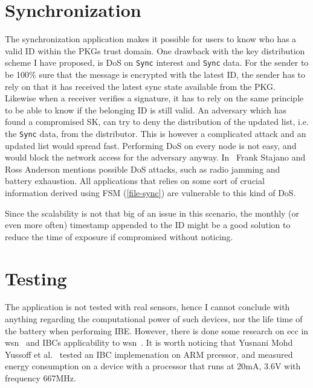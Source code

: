 \section{Synchronization}
The synchronization application makes it possible for users to know who has a valid \gls{ID} within the \gls{PKG}s trust domain.
One drawback with the key distribution scheme I have proposed, is \gls{DoS} on \texttt{Sync} \gls{interest} and \texttt{Sync} \gls{data}. 
For the sender to be 100\% sure that the message is encrypted with the latest \gls{ID}, the sender has to rely on that it has received the latest sync state available from the \gls{PKG}.
Likewise when a \gls{receiver} verifies a signature, it has to rely on the same principle to be able to know if the belonging \gls{ID} is still valid.
An adversary which has found a compromised \gls{SK}, can try to deny the distribution of the updated list, i.e. the \texttt{Sync} \gls{data}, from the distributor. 
This is however a complicated attack and an updated list would spread fast.
Performing \gls{DoS} on every node is not easy, and would block the network access for the adversary anyway.
In~\cite{DBLP:conf/spw/StajanoA99} Frank Stajano and Ross Anderson mentions possible \gls{DoS} attacks, such as radio jamming and battery exhaustion. 
All applications that relies on some sort of crucial information derived using \gls{FSM} (\autoref{file-sync}) are vulnerable to this kind of \gls{DoS}.

Since the scalability is not that big of an issue in this scenario, the monthly (or even more often) timestamp appended to the \gls{ID} might be a good solution to reduce the time of exposure if compromised without noticing.

\section{Testing}
The application is not tested with real sensors, hence I cannot conclude with anything regarding the computational power of such devices, nor the life time of the battery when performing \gls{IBE}.
However, there is done some research on \gls{ecc} in \gls{wsn}~\cite{DBLP:conf/ipsn/LiuN08, DBLP:conf/ewsn/SzczechowiakOSCD08} and \gls{IBC}s applicability to \gls{wsn}~\cite{DBLP:journals/iacr/OliveiraAMDLD07}.
It is worth noticing that Yusnani Mohd Yussoff et al.~\cite{DBLP:journals/corr/abs-1207-6185} tested an \gls{IBC} implemenation on ARM prcessor, and measured energy consumption on a device with a processor that runs at 20mA, 3.6V with frequency 667MHz.

